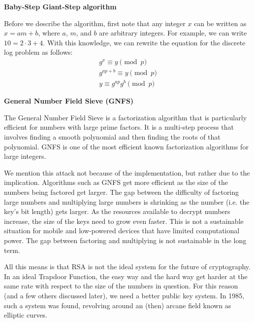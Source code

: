 \documentclass{article}
\begin{document}
    \begin{center}
        \textbf{Baby-Step Giant-Step algorithm}
    \end{center}

    Before we describe the algorithm, first note that any integer $x$ can be written as $x = am + b$, where $a$, $m$, and $b$ are arbitrary integers. For example, we can write $10 = 2 \cdot 3 + 4$. With this knowledge, we can rewrite the equation for the discrete log problem as follows:
    \begin{align*}
        g^{x} \equiv y \pmod{p} \\
        g^{ap + b} \equiv y\pmod{p} \\
        y \equiv g^{ap}g^{b} \pmod{p}
     \end{align*}
    
    \begin{center}
    \textbf{General Number Field Sieve (GNFS)}
    \end{center}
    
    The General Number Field Sieve is a factorization algorithm that is particularly efficient for numbers with large prime factors. It is a multi-step process that involves finding a smooth polynomial and then finding the roots of that polynomial. GNFS is one of the most efficient known factorization algorithms for large integers.
    
    \vspace{3mm}
    We mention this attack not because of the implementation, but rather due to the implication. Algorithms such as GNFS get more efficient as the size of the numbers being factored get larger. The gap between the difficulty of factoring large numbers and multiplying large numbers is shrinking as the number (i.e. the key's bit length) gets larger. As the resources available to decrypt numbers increase, the size of the keys need to grow even faster. This is not a sustainable situation for mobile and low-powered devices that have limited computational power. The gap between factoring and multiplying is not sustainable in the long term.
    
    \vspace{2mm}
    All this means is that RSA is not the ideal system for the future of cryptography. In an ideal Trapdoor Function, the easy way and the hard way get harder at the same rate with respect to the size of the numbers in question. For this reason (and a few others discussed later), we need a better public key system. In 1985, such a system was found, revolving around an (then) arcane field known as elliptic curves.
\end{document}
